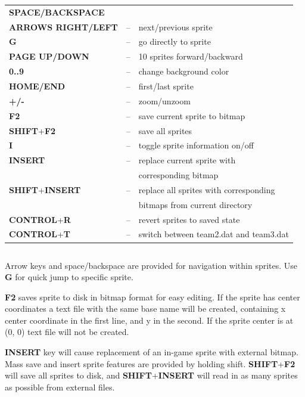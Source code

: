 \documentclass[a4paper,12pt]{article}
\begin{document}
\begin{tabular}{lll}
{\bf SPACE/BACKSPACE}\\
{\bf ARROWS RIGHT/LEFT} &--& next/previous sprite\\
{\bf G}                 &--& go directly to sprite\\
{\bf PAGE UP/DOWN}      &--& 10 sprites forward/backward\\
{\bf 0..9}              &--& change background color\\
{\bf HOME/END}          &--& first/last sprite\\
{\bf +/-}               &--& zoom/unzoom\\
{\bf F2}                &--& save current sprite to bitmap\\
{\bf SHIFT}+{\bf F2}    &--& save all sprites\\
{\bf I}                 &--& toggle sprite information on/off\\
{\bf INSERT}            &--& replace current sprite with\\
                        &  & corresponding bitmap\\
{\bf SHIFT}+{\bf INSERT} &--& replace all sprites with corresponding\\
                        &  & bitmaps from current directory\\
{\bf CONTROL}+{\bf R}   &--& revert sprites to saved state\\
{\bf CONTROL}+{\bf T}   &--& switch between team2.dat and team3.dat
\end{tabular}

\begin{verbatim}

\end{verbatim}

Arrow keys and space/backspace are provided for navigation within sprites. Use
{\bf G} for quick jump to specific sprite.

{\bf F2} saves sprite to disk in
bitmap format for easy editing. If the sprite has center coordinates a text file with the same base name will be created, containing x center coordinate in the first line, and y in the second. If the sprite center is at (0, 0) text file will not be created.

{\bf INSERT} key will cause replacement of an in-game sprite with external bitmap. Mass save and insert sprite features are
provided by holding shift. {\bf SHIFT}+{\bf F2} will save all sprites to disk, and
{\bf SHIFT}+{\bf INSERT} will read in as many sprites as possible from external
files.
\end{document}
